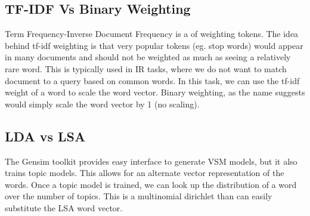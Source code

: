 \documentclass[11pt]{article}
\begin{document}
\subsection{TF-IDF Vs Binary Weighting}
Term Frequency-Inverse Document Frequency is a of weighting tokens. The idea
behind tf-idf weighting is that very popular tokens (eg. stop words) would
appear in many documents and should not be weighted as much as seeing a
relatively rare word. This is typically used in IR tasks, where we do not want
to match document to a query based on common words. In this task, we can use the
tf-idf weight of a word to scale the word vector. Binary weighting, as the name
suggests would simply scale the word vector by 1 (no scaling).
\subsection{LDA vs LSA}
The Gensim toolkit provides easy interface to generate VSM models, but it also
trains topic models. This allows for an alternate vector representation of the
words. Once a topic model is trained, we can look up the distribution of a word
over the number of topics. This is a multinomial dirichlet than can  easily
substitute the LSA word vector.
\end{document}
